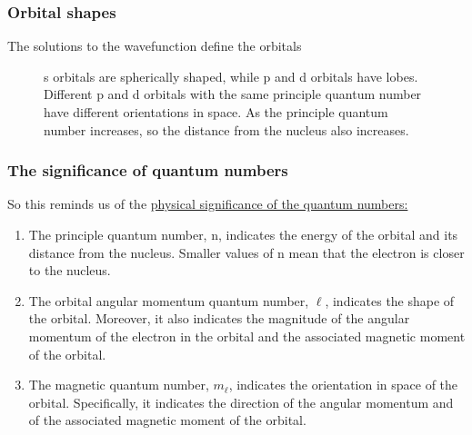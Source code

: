 \documentclass[a4paper,titlepage]{article}
\begin{document}
\begin{frame}
\frametitle{Orbital shapes}
The solutions to the wavefunction define the orbitals
\begin{figure}[h!]
\centering
{}
\caption{s orbitals are spherically shaped, while p and d orbitals have lobes. 
Different p and d orbitals with the same principle quantum number have different
orientations in space. As the principle quantum number increases, so the distance from
the nucleus also increases.}\label{orbshapes}
\end{figure}
\end{frame}

\begin{frame}
\frametitle{The significance of quantum numbers}
So this reminds us of the \underline{physical significance of the quantum numbers:}
\begin{enumerate}
\item The principle quantum number, n, indicates the energy of the orbital and its
distance from the nucleus. Smaller values of n mean that the electron is closer
to the nucleus.
\item The orbital angular momentum quantum number, \(\ell\), indicates the shape of the
orbital. Moreover, it also indicates the magnitude of the angular momentum
of the electron in the orbital and the associated magnetic moment of the
orbital.
\item The magnetic quantum number, \(m_\ell\), indicates the orientation in space of the
orbital. Specifically, it indicates the direction of the angular momentum and of
the associated magnetic moment of the orbital.
\end{enumerate}
\end{frame}

\end{document}
